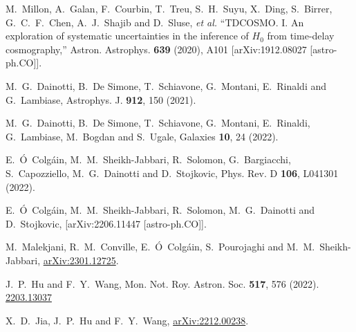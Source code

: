 \documentclass[a4paper,11pt]{article}
\begin{document}
\begin{thebibliography}{99}
M.~Millon, A.~Galan, F.~Courbin, T.~Treu, S.~H.~Suyu, X.~Ding, S.~Birrer, G.~C.~F.~Chen, A.~J.~Shajib and D.~Sluse, \textit{et al.}
``TDCOSMO. I. An exploration of systematic uncertainties in the inference of $H_0$ from time-delay cosmography,''
Astron. Astrophys. \textbf{639} (2020), A101
[arXiv:1912.08027 [astro-ph.CO]].

M.~G.~Dainotti, B.~De Simone, T.~Schiavone, G.~Montani, E.~Rinaldi and G.~Lambiase,
Astrophys. J. \textbf{912}, 150  (2021).


M.~G.~Dainotti, B.~De Simone, T.~Schiavone, G.~Montani, E.~Rinaldi, G.~Lambiase, M.~Bogdan and S.~Ugale,
Galaxies \textbf{10}, 24  (2022).

E.~\'O~Colg\'ain, M.~M.~Sheikh-Jabbari, R.~Solomon, G.~Bargiacchi, S.~Capozziello, M.~G.~Dainotti and D.~Stojkovic,
Phys. Rev. D \textbf{106}, L041301  (2022).

E.~\'O~Colg\'ain, M.~M.~Sheikh-Jabbari, R.~Solomon, M.~G.~Dainotti and D.~Stojkovic,
[arXiv:2206.11447 [astro-ph.CO]].


M.~Malekjani, R.~M.~Conville, E.~\'O~Colg\'ain, S.~Pourojaghi and M.~M.~Sheikh-Jabbari,
\href{https://arxiv.org/abs/2301.12725}{arXiv:2301.12725}.

J.~P.~Hu and F.~Y.~Wang,
Mon. Not. Roy. Astron. Soc. \textbf{517}, 576  (2022).
\href{https://arxiv.org/abs/2203.13037}{2203.13037}

X.~D.~Jia, J.~P.~Hu and F.~Y.~Wang,
\href{https://arxiv.org/abs/2212.00238}{arXiv:2212.00238}.



\end{thebibliography}
\end{document}
